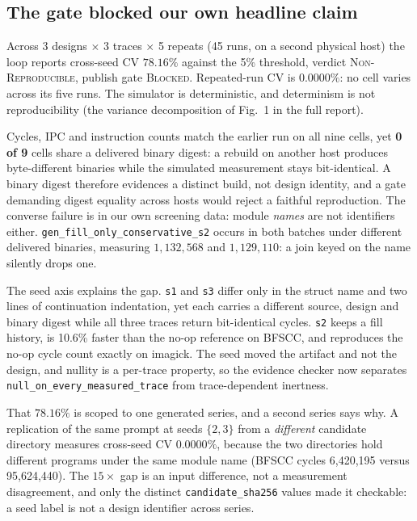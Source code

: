 \documentclass[sigconf,anonymous,nonacm]{acmart}
\begin{document}
\subsection{The gate blocked our own headline claim}
\label{sec:repro}

Across 3 designs $\times$ 3 traces $\times$ 5 repeats (45 runs, on a second physical host) the loop reports cross-seed CV $\mathbf{78.16\%}$ against the 5\% threshold, verdict \textsc{Non-Reproducible}, publish gate \textsc{Blocked}. Repeated-run CV is $\mathbf{0.0000\%}$: no cell varies across its five runs. The simulator is deterministic, and determinism is not reproducibility (the variance decomposition of Fig.~1 in the full report).

Cycles, IPC and instruction counts match the earlier run on all nine cells, yet \textbf{0 of 9} cells share a delivered binary digest: a rebuild on another host produces byte-different binaries while the simulated measurement stays bit-identical. A binary digest therefore evidences a distinct build, not design identity, and a gate demanding digest equality across hosts would reject a faithful reproduction. The converse failure is in our own screening data: module \emph{names} are not identifiers either. \texttt{gen\_fill\_only\_conservative\_s2} occurs in both batches under different delivered binaries, measuring $1{,}132{,}568$ and $1{,}129{,}110$: a join keyed on the name silently drops one.

The seed axis explains the gap. \texttt{s1} and \texttt{s3} differ only in the struct name and two lines of continuation indentation, yet each carries a different source, design and binary digest while all three traces return bit-identical cycles. \texttt{s2} keeps a fill history, is 10.6\% faster than the no-op reference on BFSCC, and reproduces the no-op cycle count exactly on imagick. The seed moved the artifact and not the design, and nullity is a per-trace property, so the evidence checker now separates \texttt{null\_on\_every\_measured\_trace} from trace-dependent inertness.

That $78.16\%$ is scoped to one generated series, and a second series says why. A replication of the same prompt at seeds $\{2,3\}$ from a \emph{different} candidate directory measures cross-seed CV $\mathbf{0.0000\%}$, because the two directories hold different programs under the same module name (BFSCC cycles 6{,}420{,}195 versus 95{,}624{,}440). The $15\times$ gap is an input difference, not a measurement disagreement, and only the distinct \texttt{candidate\_sha256} values made it checkable: a seed label is not a design identifier across series.
\end{document}
